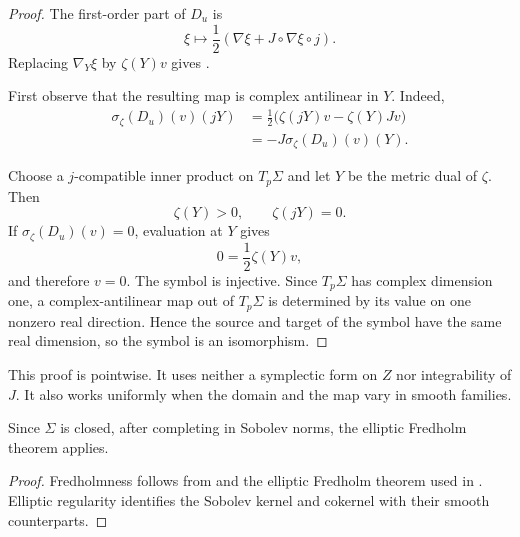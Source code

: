 \begin{proof}
  The first-order part of $D_u$ is
  \[
    \xi\longmapsto
    \frac12(\nabla\xi+J\circ\nabla\xi\circ j).
  \]
  Replacing $\nabla_Y\xi$ by $\zeta(Y)v$ gives
  .

  First observe that the resulting map is complex antilinear in $Y$. Indeed,
  \begin{align*}
    \sigma_\zeta(D_u)(v)(jY)
    &=\frac12\bigl(
       \zeta(jY)v-\zeta(Y)Jv
      \bigr)\\
    &=-J\sigma_\zeta(D_u)(v)(Y).
  \end{align*}

  Choose a $j$-compatible inner product on $T_p\Sigma$ and let $Y$ be the
  metric dual of $\zeta$. Then
  \[
    \zeta(Y)>0,
    \qquad
    \zeta(jY)=0.
  \]
  If $\sigma_\zeta(D_u)(v)=0$, evaluation at $Y$ gives
  \[
    0=\frac12\zeta(Y)v,
  \]
  and therefore $v=0$. The symbol is injective. Since $T_p\Sigma$ has complex
  dimension one, a complex-antilinear map out of $T_p\Sigma$ is determined by
  its value on one nonzero real direction. Hence the source and target of the
  symbol have the same real dimension, so the symbol is an isomorphism.
\end{proof}

This proof is pointwise. It uses neither a symplectic form on $Z$ nor
integrability of $J$. It also works uniformly when the domain and the map vary
in smooth families.

Since $\Sigma$ is closed, after completing in Sobolev norms,
the elliptic Fredholm theorem applies.


\begin{proof}
  Fredholmness follows from
   and the elliptic Fredholm
  theorem used in
  .
  Elliptic regularity identifies the Sobolev kernel and cokernel with their
  smooth counterparts.
\end{proof}

